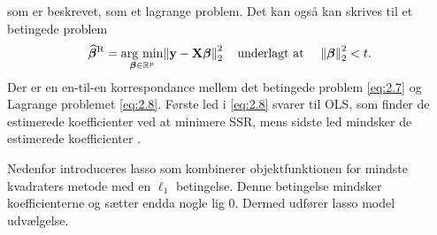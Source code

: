 som er beskrevet, som et lagrange problem. 
Det kan også kan skrives til et betingede problem 
\begin{align}
 \widehat{\boldsymbol\beta}^{\text{R}} = \underset{\boldsymbol{\beta} \in \mathbb{R}^p}{\operatorname*{\arg\,\min}} \norm{\mathbf{y} - \mathbf{X}\boldsymbol\beta}^2_2 \quad \text{underlagt at } \quad \norm{\boldsymbol\beta}_2^2 < t \label{eq:2.7}.
\end{align}
Der er en en-til-en korrespondance mellem det betingede problem \eqref{eq:2.7} og Lagrange problemet \eqref{eq:2.8}.
Første led i \eqref{eq:2.8} svarer til OLS, som finder de estimerede koefficienter ved at minimere SSR, mens sidste led mindsker de estimerede koefficienter .



%





Nedenfor introduceres lasso som kombinerer objektfunktionen for mindste kvadraters metode med en $\ell_1$ betingelse. Denne betingelse mindsker koefficienterne og sætter endda nogle lig 0. Dermed udfører lasso model udvælgelse.

